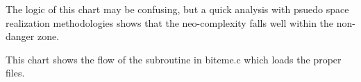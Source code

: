 %
\def\picture#1{\filbreak\bigskip \bigskip}

\picture{flow1.tex}
The logic of this chart may be confusing, but a quick analysis with psuedo space
realization methodologies shows that the neo-complexity falls well within the
non-danger zone.

\picture{flow2.tex}
This chart shows the flow of the subroutine in biteme.c which loads the proper
files. 

\picture{flow3.tex}

\bye
